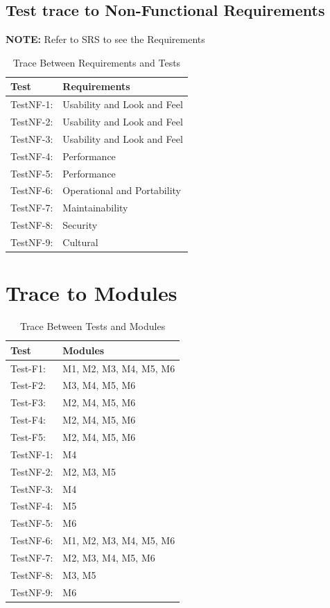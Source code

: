 \documentclass[12pt, titlepage]{article}
\begin{document}
\subsection{Test trace to Non-Functional Requirements}

\textbf{NOTE:} Refer to SRS to see the Requirements\\

\begin{table}[!h]
\centering
\begin{tabular}{p{} p{}}
\toprule
\textbf{Test} & \textbf{Requirements}\\
\midrule
TestNF-1:  & Usability and Look and Feel \\
TestNF-2:  & Usability and Look and Feel   \\
TestNF-3:  & Usability and Look and Feel\\
TestNF-4:  & Performance \\
TestNF-5:  & Performance \\
TestNF-6:  & Operational and Portability \\
TestNF-7:  & Maintainability \\
TestNF-8:  & Security \\
TestNF-9:  & Cultural \\
\bottomrule
\end{tabular}
\caption{Trace Between Requirements and Tests}
\end{table}

\section{Trace to Modules}	

\begin{table}[H]
\centering
\begin{tabular}{p{} p{}}
\toprule
\textbf{Test} & \textbf{Modules}\\
\midrule
Test-F1:  & M1, M2, M3, M4, M5, M6 \\
Test-F2:  & M3, M4, M5, M6   \\
Test-F3:  & M2, M4, M5, M6 \\
Test-F4:  & M2, M4, M5, M6 \\
Test-F5:  & M2, M4, M5, M6 \\
TestNF-1:  & M4 \\
TestNF-2:  & M2, M3, M5  \\
TestNF-3:  & M4 \\
TestNF-4:  & M5 \\
TestNF-5:  & M6 \\
TestNF-6:  & M1, M2, M3, M4, M5, M6 \\
TestNF-7:  & M2, M3, M4, M5, M6 \\
TestNF-8:  & M3, M5 \\
TestNF-9:  & M6 \\
\bottomrule
\end{tabular}
\caption{Trace Between Tests and Modules}
\end{table}
\end{document}
